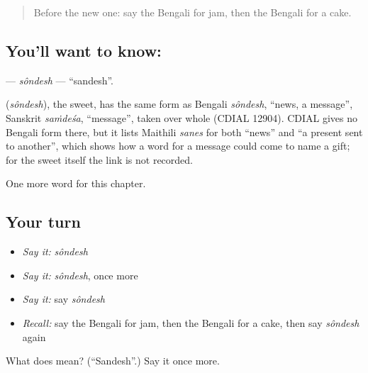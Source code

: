 \label{lesson:BN-C165-sondesh}



\begin{quote}
Before the new one: say the Bengali for jam, then the Bengali for a cake.
\end{quote}

\subsection*{You'll want to know: }
\textbf{} — \emph{sôndesh} — \textquotedblleft{}sandesh\textquotedblright{}.

\begin{cousinweb}
\textbf{} (\emph{sôndesh}), the sweet, has the same form as Bengali \emph{sôndesh}, \textquotedblleft{}news, a message\textquotedblright{}, Sanskrit \emph{saṁdeśa}, \textquotedblleft{}message\textquotedblright{}, taken over whole (CDIAL 12904). CDIAL gives no Bengali form there, but it lists Maithili \emph{sanes} for both \textquotedblleft{}news\textquotedblright{} and \textquotedblleft{}a present sent to another\textquotedblright{}, which shows how a word for a message could come to name a gift; for the sweet itself the link is not recorded.
\end{cousinweb}

\begin{grammarlens}[title={What you've built}]
One more word for this chapter.
\end{grammarlens}

\subsection*{Your turn}
\begin{itemize}
\raggedright
  \item \emph{Say it:} \emph{sôndesh}
  \item \emph{Say it:} \emph{sôndesh}, once more
  \item \emph{Say it:} say \emph{sôndesh}
  \item \emph{Recall:} say the Bengali for jam, then the Bengali for a cake, then say \emph{sôndesh} again
\end{itemize}

\begin{tcolorbox}[breakable,colback=teal!4,colframe=teal!35!black,title={Before you move on}]
What does  mean? (\textquotedblleft{}Sandesh\textquotedblright{}.) Say it once more.
\end{tcolorbox}
